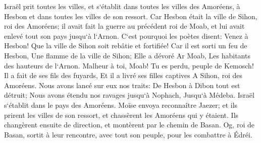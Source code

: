 \verse Israël prit toutes les villes, et s`établit dans toutes les villes des Amoréens, à Hesbon et dans toutes les villes de son ressort. 
\verse Car Hesbon était la ville de Sihon, roi des Amoréens; il avait fait la guerre au précédent roi de Moab, et lui avait enlevé tout son pays jusqu`à l`Arnon. 
\verse C`est pourquoi les poètes disent: Venez à Hesbon! Que la ville de Sihon soit rebâtie et fortifiée! 
\verse Car il est sorti un feu de Hesbon, Une flamme de la ville de Sihon; Elle a dévoré Ar Moab, Les habitants des hauteurs de l`Arnon. 
\verse Malheur à toi, Moab! Tu es perdu, peuple de Kemosch! Il a fait de ses fils des fuyards, Et il a livré ses filles captives A Sihon, roi des Amoréens. 
\verse Nous avons lancé sur eux nos traits: De Hesbon à Dibon tout est détruit; Nous avons étendu nos ravages jusqu`à Nophach, Jusqu`à Médeba. 
\verse Israël s`établit dans le pays des Amoréens. 
\verse Moïse envoya reconnaître Jaezer; et ils prirent les villes de son ressort, et chassèrent les Amoréens qui y étaient. 
\verse Ils changèrent ensuite de direction, et montèrent par le chemin de Basan. Og, roi de Basan, sortit à leur rencontre, avec tout son peuple, pour les combattre à Édréi. 
